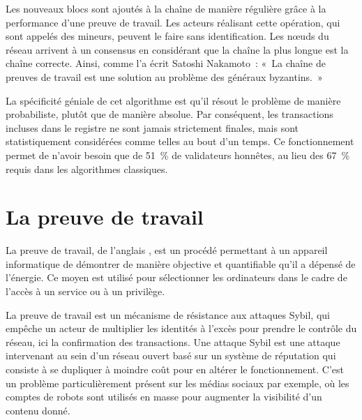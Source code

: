 Les nouveaux blocs sont ajoutés à la chaîne de manière régulière grâce à la performance d'une preuve de travail. Les acteurs réalisant cette opération, qui sont appelés des mineurs, peuvent le faire sans identification. Les nœuds du réseau arrivent à un consensus en considérant que la chaîne la plus longue est la chaîne correcte. Ainsi, comme l'a écrit Satoshi Nakamoto~: «~La chaîne de preuves de travail est une solution au problème des généraux byzantins.~»

La spécificité géniale de cet algorithme est qu'il résout le problème de manière probabiliste, plutôt que de manière absolue. Par conséquent, les transactions incluses dans le registre ne sont jamais strictement finales, mais sont statistiquement considérées comme telles au bout d'un temps. Ce fonctionnement permet de n'avoir besoin que de 51~\% de validateurs honnêtes, au lieu des 67~\% requis dans les algorithmes classiques. 



\section*{La preuve de travail}

La preuve de travail, de l'anglais , est un procédé permettant à un appareil informatique de démontrer de manière objective et quantifiable qu'il a dépensé de l'énergie. Ce moyen est utilisé pour sélectionner les ordinateurs dans le cadre de l'accès à un service ou à un privilège.

La preuve de travail est un mécanisme de résistance aux attaques Sybil, qui empêche un acteur de multiplier les identités à l'excès pour prendre le contrôle du réseau, ici la confirmation des transactions. Une attaque Sybil est une attaque intervenant au sein d'un réseau ouvert basé sur un système de réputation qui consiste à se dupliquer à moindre coût pour en altérer le fonctionnement. C'est un problème particulièrement présent sur les médias sociaux par exemple, où les comptes de robots sont utilisés en masse pour augmenter la visibilité d'un contenu donné.

